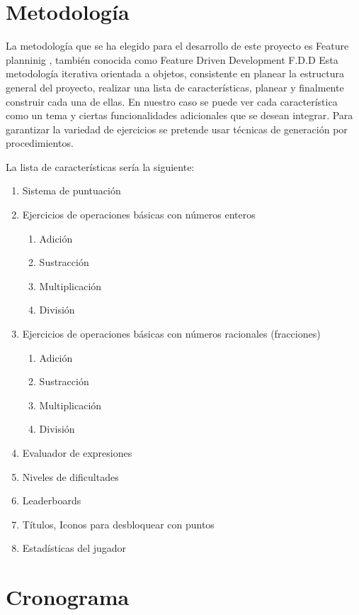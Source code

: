 \documentclass{article}
\begin{document}
\section{Metodología}
La metodología que se ha elegido para el desarrollo de este proyecto es Feature planninig \cite{hunt2006feature}, 
también conocida como Feature Driven Development F.D.D Esta metodología iterativa 
orientada a objetos, consistente en planear la estructura general del proyecto, 
realizar una lista de características, planear y finalmente construir cada una de ellas. 
En nuestro caso se puede ver cada característica como un tema y ciertas funcionalidades 
adicionales que se desean integrar. Para garantizar la variedad de ejercicios se pretende 
usar técnicas de generación por procedimientos.

La lista de características sería la siguiente:
\begin{enumerate}
	\item Sistema de puntuación
	\item Ejercicios de operaciones básicas con números enteros
	\begin{enumerate}
		\item Adición
		\item Sustracción
		\item Multiplicación
		\item División
	\end{enumerate}
	\item Ejercicios de operaciones básicas con números racionales (fracciones)
	\begin{enumerate}
		\item Adición
		\item Sustracción
		\item Multiplicación
		\item División
	\end{enumerate}
	\item Evaluador de expresiones
	\item Niveles de dificultades
	\item Leaderboards
	\item Títulos, Iconos para desbloquear con puntos
	\item Estadísticas del jugador
\end{enumerate}

\section{Cronograma}
\end{document}
